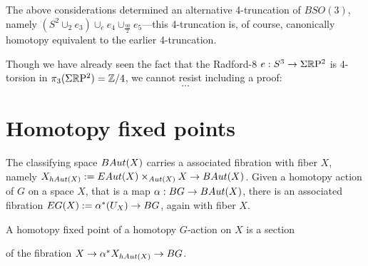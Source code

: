 \documentclass{amsart}
\begin{document}
\begin{remark}
The above considerations determined an alternative 4-truncation of $BSO(3)$, namely $(S^2 \cup_2 e_3) \cup_{e} e_4 \cup_{\frac{\eta q}{2}} e_5$---this 4-truncation is, of course, canonically homotopy equivalent to the earlier 4-truncation.  %
\end{remark}

Though we have already seen the fact that the Radford-8 $e: S^3 \rightarrow \Sigma\mathbb R \mathrm{P}^2$ is 4-torsion in $\pi_3(\Sigma \mathbb R \mathrm{P}^2) = \mathbb Z/4$, we cannot resist including a proof: 
\[
...
\]


\section{Homotopy fixed points}


The classifying space $BAut(X)$ carries a associated fibration with fiber $X$, namely $X_{hAut(X)} := EAut(X) \times_{Aut(X)} X \rightarrow BAut(X)$.    Given a homotopy action of $G$ on a space $X$, that is a map $\alpha: BG \rightarrow BAut(X)$, there is an associated fibration $EG(X):=\alpha^\ast(U_X) \rightarrow BG$, again with fiber $X$.

\begin{definition}
A homotopy fixed point of a homotopy $G$-action on $X$ is a section
\begin{center}
\end{center}
of the fibration $X \rightarrow \alpha^*X_{hAut(X)} \rightarrow BG$.
\end{definition}
\end{document}
